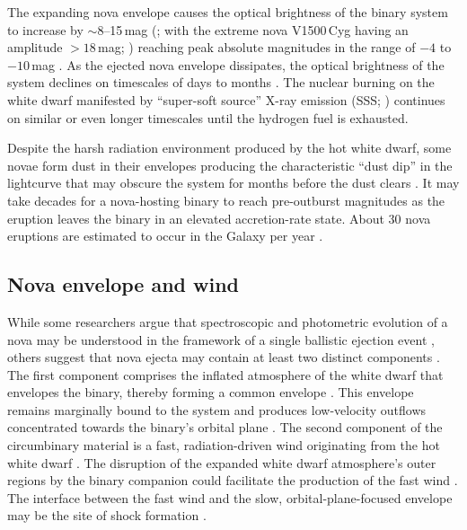 \documentclass[twocolumn]{aastex631}
\begin{document}
The expanding nova envelope causes the optical brightness of the binary system to 
increase by $\sim 8$--15\,mag (\citealt{1990ApJ...356..609V,2008clno.book.....W,2021ApJ...910..120K};
with the extreme nova V1500\,Cyg having an amplitude $>18$\,mag; \citealt{1975Natur.258..501L})
reaching peak absolute magnitudes in the range of $-4$ to $-10$\,mag \citep{2017ApJ...834..196S,2009ApJ...690.1148S,2022MNRAS.517.6150S}.
As the ejected nova envelope dissipates, the optical brightness of the system declines on 
timescales of days \citep{2016ApJ...833..149D} to months \citep{2010AJ....140...34S}. 
The nuclear burning on the white dwarf manifested by ``super-soft source'' X-ray
emission (SSS; \citealt{2011ApJS..197...31S,2013A&A...559A..50N}) continues on similar or even longer timescales
until the hydrogen fuel is exhausted. 

Despite the harsh radiation environment produced by the hot white dwarf, 
some novae form dust in their envelopes producing the characteristic ``dust dip''
in the lightcurve that may obscure the system for months 
before the dust clears \citep{2008clno.book.....B,2017MNRAS.469.1314D}.
It may take decades for a nova-hosting binary to reach pre-outburst
magnitudes as the eruption leaves the binary in an elevated accretion-rate state.
About 30 nova eruptions are estimated to occur in the Galaxy per year
\citep{2017ApJ...834..196S,2021ApJ...912...19D,2022arXiv220614132K,2022arXiv220705689R,2023arXiv230308795Z}.

\subsection{Nova envelope and wind}
\label{sec:envwind}

While some researchers argue that spectroscopic and photometric evolution of
a nova may be understood in the framework of a single ballistic ejection 
event \citep{2012BASI...40..185S,2013A&A...559L...7S,2018ApJ...853...27M,2020A&A...635A.115M}, 
others suggest that nova ejecta may contain at least two distinct components
\citep{1947PASP...59..244M,1987A&A...180..155F,2020ApJ...905...62A}. 
The first component comprises the inflated atmosphere of the white dwarf that envelopes the binary, 
thereby forming a common envelope \citep{1990ApJ...356..250L,2021ApJ...914....5S,2022ApJ...938...31S}. 
This envelope remains marginally bound to the system and produces low-velocity outflows concentrated towards 
the binary's orbital plane \citep{2016MNRAS.461.2527P,2022ApJ...938...31S}.
The second component of the circumbinary material is a fast, radiation-driven wind 
originating from the hot white dwarf \citep{1990LNP...369..244F,1994ApJ...437..802K,2004BaltA..13..116F,2001MNRAS.326..126S,2002ASPC..261..585S,2020NatAs...4..776A}. 
The disruption of the expanded white dwarf atmosphere's outer regions by the binary companion could facilitate 
the production of the fast wind \citep{2022ApJ...938...31S}. 
The interface between the fast wind and the slow, orbital-plane-focused envelope 
may be the site of shock formation \citep{2014Natur.514..339C,2021ARA&A..59..391C,2019PhT....72k..38M}.
\end{document}
